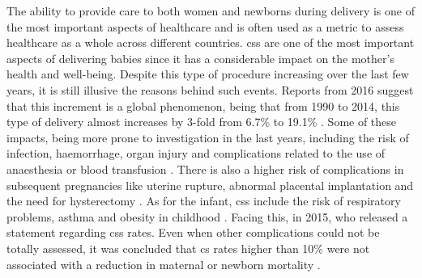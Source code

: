 The ability to provide care to both women and newborns during delivery is one of the most important aspects of healthcare and is often used as a metric to assess healthcare as a whole across different countries.
\acp{cs} are one of the most important aspects of delivering babies since it has a considerable impact on the mother's health and well-being. Despite this type of procedure increasing over the last few years, it is still illusive the reasons behind such events. Reports from 2016 suggest that this increment is a global phenomenon, being that from 1990 to 2014, this type of delivery almost increases by 3-fold from 6.7\% to 19.1\% \cite{betranIncreasingTrendCaesarean2016,chenNonClinicalInterventions2018}. Some of these impacts, being more prone to investigation in the last years, including the risk of infection, haemorrhage, organ injury and complications related to the use of anaesthesia or blood transfusion \cite{caesereanrisk1,caesereanrisk2}.
There is also a higher risk of complications in subsequent pregnancies like uterine rupture, abnormal placental implantation and the need for hysterectomy \cite{caesereanrisk3,caesereanrisk4}. As for the infant, \acp{cs} include the risk of respiratory problems, asthma and obesity in childhood \cite{caesereanrisk3}.
Facing this, in 2015, \ac{who} released a statement regarding \acp{cs} rates. Even when other complications could not be totally assessed, it was concluded that \ac{cs} rates higher than 10\% were not associated with a reduction in maternal or newborn mortality \cite{worldhealthorganizationhumanreproductionprogramme10april2015WHOStatementCaesarean2015}.

